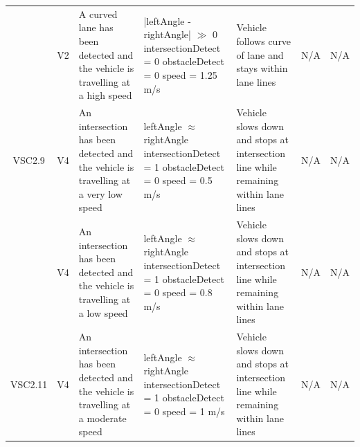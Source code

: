 \documentclass [10pt]{article}
\begin{document}
\begin{longtable}{ | p{ } | p{ } |  p{ } |  p{ } | p{ } | p{ } |  p{ } |}
    \rowcolor{tableCell}\multicolumn{1}{|c|}{VSC2.8} 
    & \multicolumn{1}{c|}{V2}
    & A curved lane has been detected and the vehicle is travelling at a high speed
     & |leftAngle - rightAngle| $\gg$ 0 \newline
    intersectionDetect = 0 \newline
    obstacleDetect = 0 \newline
    speed = 1.25 m/s
    & Vehicle follows curve of lane and stays within lane lines
    & N/A
    & \multicolumn{1}{c|}{N/A}\\ 
    
    \multicolumn{1}{|c|}{VSC2.9} 
    & \multicolumn{1}{c|}{V4}
    & An intersection has been detected and the vehicle is travelling at a very low speed
    & leftAngle $\approx$ rightAngle \newline
    intersectionDetect = 1 \newline
    obstacleDetect = 0 \newline
    speed = 0.5 m/s
    & Vehicle slows down and stops at intersection line while remaining within lane lines
    & N/A
    & \multicolumn{1}{c|}{N/A}\\ 
    
    \rowcolor{tableCell}\multicolumn{1}{|c|}{VSC2.10} 
    & \multicolumn{1}{c|}{V4}
    & An intersection has been detected and the vehicle is travelling at a low speed
    & leftAngle $\approx$ rightAngle \newline
    intersectionDetect = 1 \newline
    obstacleDetect = 0 \newline
    speed = 0.8 m/s
    & Vehicle slows down and stops at intersection line while remaining within lane lines
    & N/A
    & \multicolumn{1}{c|}{N/A}\\ 
    
    \multicolumn{1}{|c|}{VSC2.11} 
    & \multicolumn{1}{c|}{V4}
    & An intersection has been detected and the vehicle is travelling at a moderate speed
    & leftAngle $\approx$ rightAngle \newline
    intersectionDetect = 1 \newline
    obstacleDetect = 0 \newline
    speed = 1 m/s
    & Vehicle slows down and stops at intersection line while remaining within lane lines
    & N/A
    & \multicolumn{1}{c|}{N/A}\\
    

\end{longtable}
\end{document}
